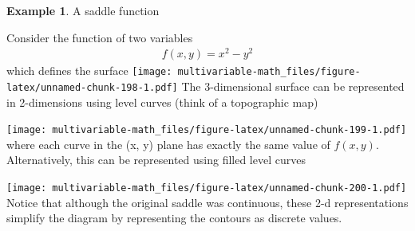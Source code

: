 \documentclass[
]{book}
\newenvironment{Shaded}{\begin{snugshade}}{\end{snugshade}}
\newcommand{\DataTypeTok}[1]{\textcolor[rgb]{0.13,0.29,0.53}{#1}}
\newcommand{\DecValTok}[1]{\textcolor[rgb]{0.00,0.00,0.81}{#1}}
\newcommand{\KeywordTok}[1]{\textcolor[rgb]{0.13,0.29,0.53}{\textbf{#1}}}
\newcommand{\NormalTok}[1]{#1}
\newcommand{\OperatorTok}[1]{\textcolor[rgb]{0.81,0.36,0.00}{\textbf{#1}}}
\newcommand{\StringTok}[1]{\textcolor[rgb]{0.31,0.60,0.02}{#1}}
\theoremstyle{definition}
\theoremstyle{definition}
\newtheorem{example}{Example}[chapter]
\theoremstyle{definition}
\theoremstyle{definition}
\theoremstyle{remark}
\begin{document}
\begin{example}
A saddle function

Consider the function of two variables
\[
\begin{aligned}
f(x, y) = x^2 - y^2
\end{aligned}
\]
which defines the surface
\texttt{[image: multivariable-math\_files/figure-latex/unnamed-chunk-198-1.pdf]}
The 3-dimensional surface can be represented in 2-dimensions using level curves (think of a topographic map)

\begin{Shaded}
\end{Shaded}

\texttt{[image: multivariable-math\_files/figure-latex/unnamed-chunk-199-1.pdf]}
where each curve in the (x, y) plane has exactly the same value of \(f(x, y)\). Alternatively, this can be represented using filled level curves

\begin{Shaded}
\end{Shaded}

\texttt{[image: multivariable-math\_files/figure-latex/unnamed-chunk-200-1.pdf]}
Notice that although the original saddle was continuous, these 2-d representations simplify the diagram by representing the contours as discrete values.
\end{example}
\end{document}
